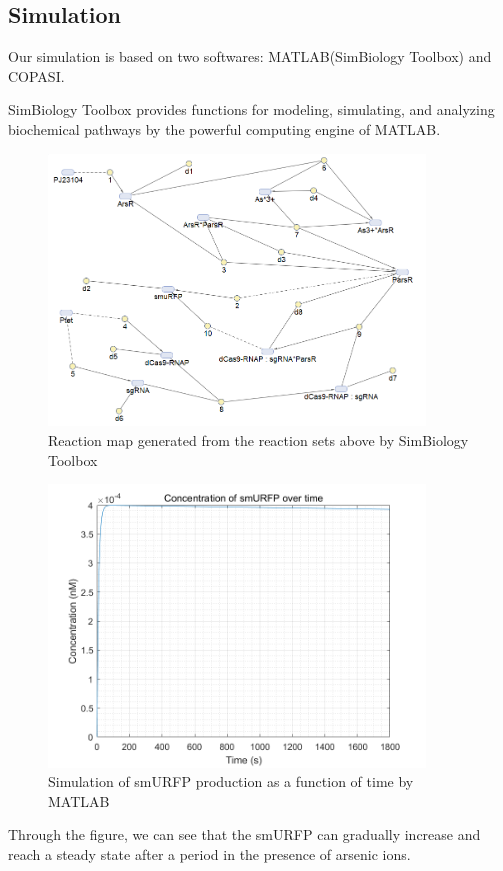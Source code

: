 \subsection{Simulation }
Our simulation is based on two softwares: MATLAB(SimBiology Toolbox) and COPASI.

SimBiology Toolbox provides functions for modeling, simulating, and analyzing biochemical pathways by the powerful computing engine of MATLAB.

\begin{figure}[h]
	\centering
	\includegraphics[width=10cm]{screenshot003}	
	\caption{Reaction map generated from the reaction sets above by SimBiology Toolbox}
\end{figure}



\begin{figure}[H]
	\centering
	\includegraphics[width=10cm]{11}
	\caption{Simulation of smURFP production as a function of time by MATLAB}
\end{figure}

Through the figure, we can see that the smURFP can gradually increase and reach a steady state after a period in the presence of arsenic ions.

